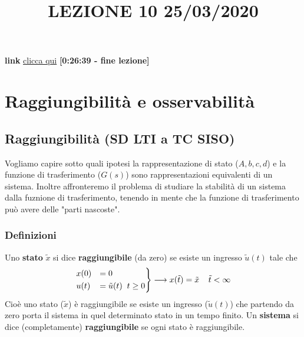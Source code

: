 \newpage
\title{LEZIONE 10 25/03/2020}\newline
\textbf{link} \href{https://web.microsoftstream.com/video/562a82e0-19cc-4f81-9183-eee77c9c45a4?list=user&userId=faa91214-a6f5-40d7-8875-253fd49b8ce1}{clicca qui} \;\;\textbf{[0:26:39 - fine lezione]}
\section{Raggiungibilità e osservabilità}
\subsection{Raggiungibilità (SD LTI a TC SISO)}
Vogliamo capire sotto quali ipotesi la rappresentazione di stato ($A, b, c, d$) e la funzione di trasferimento ($G(s)$) sono rappresentazioni equivalenti di un sistema. Inoltre affronteremo il problema di studiare la stabilità di un sistema dalla fuznione di trasferimento, tenendo in mente che la funzione di trasferimento può avere delle "parti nascoste".
\subsubsection{Definizioni}
Uno \textbf{stato} $\tilde{x}$ si dice \textbf{raggiungibile} (da zero) se esiste un ingresso $\tilde{u}(t)$ tale che 
\[
    \begin{rcases}
        x(0) &= 0 \\
        u(t) &= \tilde{u}(t) \;\; t \geq 0
    \end{rcases} \longrightarrow x(\tilde{t}) = \tilde{x}  \;\;\;\; \tilde{t}< \infty
\]
Cioè uno stato ($\tilde{x}$) è raggiungibile se esiste un ingresso ($\tilde{u}(t)$) che partendo da zero porta il sistema in quel determinato stato in un tempo finito.\newline
\newline
Un \textbf{sistema} si dice (completamente) \textbf{raggiungibile} se ogni stato è raggiungibile.
